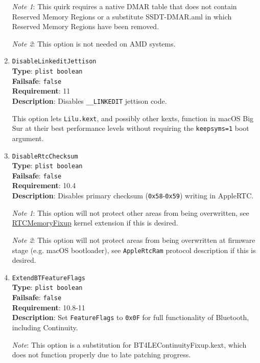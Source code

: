\documentclass[]{article}
\begin{document}
\begin{enumerate}
  \emph{Note 1}: This quirk requires a native DMAR table that does not contain Reserved Memory
  Regions or a substitute SSDT-DMAR.aml in which Reserved Memory Regions
  have been removed.

  \emph{Note 2}: This option is not needed on AMD systems.

\item
  \texttt{DisableLinkeditJettison}\\
  \textbf{Type}: \texttt{plist\ boolean}\\
  \textbf{Failsafe}: \texttt{false}\\
  \textbf{Requirement}: 11\\
  \textbf{Description}: Disables \texttt{\_\_LINKEDIT} jettison code.

  This option lets \texttt{Lilu.kext}, and possibly other kexts, function
  in macOS Big Sur at their best performance levels without requiring the
  \texttt{keepsyms=1} boot argument.

\item
  \texttt{DisableRtcChecksum}\\
  \textbf{Type}: \texttt{plist\ boolean}\\
  \textbf{Failsafe}: \texttt{false}\\
  \textbf{Requirement}: 10.4\\
  \textbf{Description}: Disables primary checksum (\texttt{0x58}-\texttt{0x59})
  writing in AppleRTC.

  \emph{Note 1}: This option will not protect other areas from being overwritten,
  see \href{https://github.com/acidanthera/RTCMemoryFixup}{RTCMemoryFixup}
  kernel extension if this is desired.

  \emph{Note 2}: This option will not protect areas from being overwritten
  at firmware stage (e.g. macOS bootloader), see \texttt{AppleRtcRam} protocol
  description if this is desired.

\item
  \texttt{ExtendBTFeatureFlags}\\
  \textbf{Type}: \texttt{plist\ boolean}\\
  \textbf{Failsafe}: \texttt{false}\\
  \textbf{Requirement}: 10.8-11\\
  \textbf{Description}: Set \texttt{FeatureFlags} to \texttt{0x0F} for full
  functionality of Bluetooth, including Continuity.

  \emph{Note}: This option is a substitution for BT4LEContinuityFixup.kext,
  which does not function properly due to late patching progress.


\end{enumerate}
\end{document}

